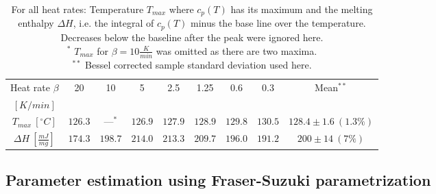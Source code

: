 \documentclass{scrartcl}[12pt, halfparskip]
\numberwithin{equation}{section}
\numberwithin{figure}{section}
\numberwithin{table}{section}
\begin{document}
\begin{table}[H]
	\centering
	\begin{tabular}{| c | c | c | c | c | c | c | c || c |} \hline
		Heat rate $\beta$ & 20 & 10 & 5 & 2.5 & 1.25 & 0.6 & 0.3 & Mean$^{**}$ \\
		$[K/min]$ & & & & & & & & \\ \hline
		$T_{max} \ [^{\circ}C]$ & $126.3$ & ---$^*$ & $126.9$ & $127.9$ & $128.9$ & $129.8$ & $130.5$ & $128.4 \pm 1.6 \ (1.3\%)$ \\[0.7ex]
		$\Delta H \ [\frac{mJ}{mg}]$ & $174.3$ & $198.7$ & $214.0$ & $213.3$ & $209.7$ & $196.0$ & $191.2$ & $200 \pm 14 \ (7\%)$ \\ \hline
	\end{tabular}
	\caption{For all heat rates: Temperature $T_{max}$ where $c_p(T)$ has its maximum and the melting enthalpy $\Delta H$, i.e. the integral of $c_p(T)$ minus the base line over the temperature. Decreases below the baseline after the peak were ignored here. \\
	$^*$ $T_{max}$ for $\beta=10\frac{K}{min}$ was omitted as there are two maxima. \\
	$^{**}$ Bessel corrected sample standard deviation used here.}
	\label{tab:eval_table_Tmax_deltaH_5Gaussians}
\end{table}


\subsection{Parameter estimation using Fraser-Suzuki parametrization}
\label{sec:param_estimation_fs}
\end{document}
